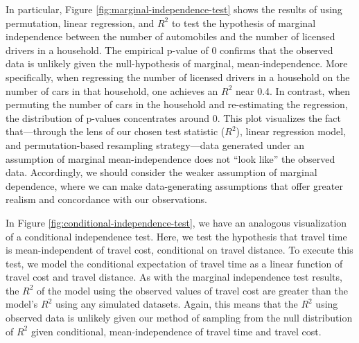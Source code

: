 
In particular, Figure \ref{fig:marginal-independence-test} shows the results of using permutation, linear regression, and $R^2$ to test the hypothesis of marginal independence between the number of automobiles and the number of licensed drivers in a household.
The empirical p-value of 0 confirms that the observed data is unlikely given the null-hypothesis of marginal, mean-independence.
More specifically, when regressing the number of licensed drivers in a household on the number of cars in that household, one achieves an $R^2$ near 0.4.
In contrast, when permuting the number of cars in the household and re-estimating the regression, the distribution of p-values concentrates around 0.
This plot visualizes the fact that---through the lens of our chosen test statistic ($R^2$), linear regression model, and permutation-based resampling strategy---data generated under an assumption of marginal mean-independence does not ``look like'' the observed data.
Accordingly, we should consider the weaker assumption of marginal dependence, where we can make data-generating assumptions that offer greater realism and concordance with our observations.

In Figure \ref{fig:conditional-independence-test}, we have an analogous visualization of a conditional independence test.
Here, we test the hypothesis that travel time is mean-independent of travel cost, conditional on travel distance.
To execute this test, we model the conditional expectation of travel time as a linear function of travel cost and travel distance.
As with the marginal independence test results, the $R^2$ of the model using the observed values of travel cost are greater than the model's $R^2$ using any simulated datasets.
Again, this means that the $R^2$ using observed data is unlikely given our method of sampling from the null distribution of $R^2$ given conditional, mean-independence of travel time and travel cost.

